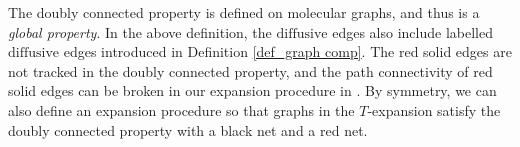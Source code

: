 \documentclass{article}
\newcommand{\1}{\mathds{1}}
\numberwithin{equation}{section}
\renewcommand{\cal}{\mathcal}
\newcommand{\dashed}{\text{diffusive}}
\theoremstyle{plain} %
\theoremstyle{remark}
\newtheorem{remark}[theorem]{Remark}
\newcommand{\cor}{\color{red}}
\newcommand{\cob}{\color{purple}}
\newcommand{\hty}[1]{{\cor (ht: #1) }}
\begin{document}
The doubly connected property is defined on molecular graphs, and thus is a \emph{global property}. In the above definition, the $\dashed$ edges also include labelled $\dashed$ edges introduced in Definition \ref{def_graph comp}. The red solid edges are not tracked in the doubly connected property, and the path connectivity of red solid edges can be broken in our expansion procedure in \cite{PartII_high}. By symmetry, we can also define an expansion procedure so that graphs in the $T$-expansion satisfy the doubly connected property with a black net and a red net.   




\end{document}

